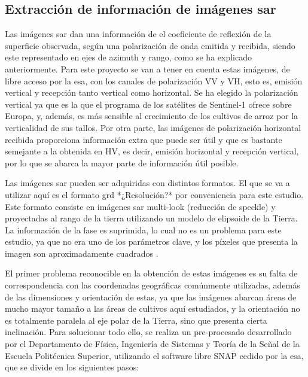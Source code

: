 \subsection{Extracción de información de imágenes \gls{sar}}
\par Las imágenes \gls{sar} dan una información de el coeficiente de reflexión de la superficie observada, según una polarización de onda emitida y recibida, siendo este representado en ejes de azimuth y rango, como se ha explicado anteriormente. Para este proyecto se van a tener en cuenta estas imágenes, de libre acceso por la \gls{esa}, con los canales de polarización VV y VH, esto es, emisión vertical y recepción tanto vertical como horizontal. Se ha elegido la polarización vertical ya que es la que el programa de los satélites de Sentinel-1 ofrece sobre Europa, y, además, es más sensible al crecimiento de los cultivos de arroz por la verticalidad de sus tallos. Por otra parte, las imágenes de polarización horizontal recibida proporciona información extra que puede ser útil y que es bastante semejante a la obtenida en HV, es decir, emisión horizontal y recepción vertical, por lo que se abarca la mayor parte de información útil posible. 
\\
\par Las imágenes \gls{sar} pueden ser adquiridas con distintos formatos. El que se va a utilizar aquí es el formato \gls{grd} *¿Resolución?* por conveniencia para este estudio. Este formato consiste en imágenes \gls{sar} multi-look (reducción de speckle) y proyectadas al rango de la tierra utilizando un modelo de elipsoide de la Tierra. La información de la fase es suprimida, lo cual no es un problema para este estudio, ya que no era uno de los parámetros clave, y los píxeles que presenta la imagen son aproximadamente cuadrados \cite{copData}. 
\\
\par El primer problema reconocible en la obtención de estas imágenes es su falta de correspondencia con las coordenadas geográficas comúnmente utilizadas, además de las dimensiones y orientación de estas, ya que las imágenes abarcan áreas de mucho mayor tamaño a las áreas de cultivos aquí estudiados, y la orientación no es totalmente paralela al eje polar de la Tierra, sino que presenta cierta inclinación. Para solucionar todo ello, se realiza un pre-procesado desarrollado por el Departamento de Física, Ingeniería de Sistemas y Teoría de la Señal de la Escuela Politécnica Superior, utilizando el software libre SNAP cedido por la \gls{esa}, que se divide en los siguientes pasos:
